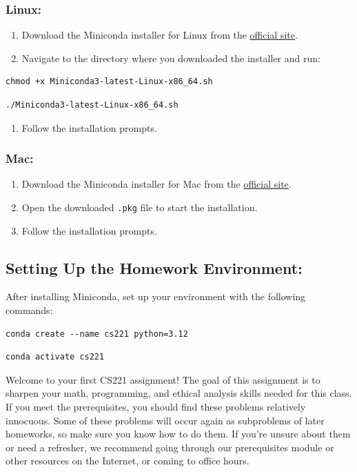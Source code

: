 \documentclass{article}
\theoremstyle{case}
\theoremstyle{definition}
\begin{document}
\subsubsection*{Linux:}
\begin{enumerate}
    \item Download the Miniconda installer for Linux from the \href{https://docs.conda.io/en/latest/miniconda.html}{official site}.
    \item Navigate to the directory where you downloaded the installer and run:
\end{enumerate}
\begin{verbatim}
chmod +x Miniconda3-latest-Linux-x86_64.sh
\end{verbatim}
\begin{verbatim}
./Miniconda3-latest-Linux-x86_64.sh
\end{verbatim}
\begin{enumerate}[resume]
    \item Follow the installation prompts.
\end{enumerate}

\subsubsection*{Mac:}
\begin{enumerate}
    \item Download the Miniconda installer for Mac from the \href{https://docs.conda.io/en/latest/miniconda.html}{official site}.
    \item Open the downloaded \texttt{.pkg} file to start the installation.
    \item Follow the installation prompts.
\end{enumerate}

\subsection*{Setting Up the Homework Environment:}
After installing Miniconda, set up your environment with the following commands:

\begin{verbatim}
conda create --name cs221 python=3.12
\end{verbatim}
\begin{verbatim}
conda activate cs221
\end{verbatim}

Welcome to your first CS221 assignment! The goal of this assignment is to sharpen your math, programming, and ethical analysis skills needed for this class. If you meet the prerequisites, you should find these problems relatively innocuous. Some of these problems will occur again as subproblems of later homeworks, so make sure you know how to do them. If you're unsure about them or need a refresher, we recommend going through our prerequisites module or other resources on the Internet, or coming to office hours.
\end{document}
